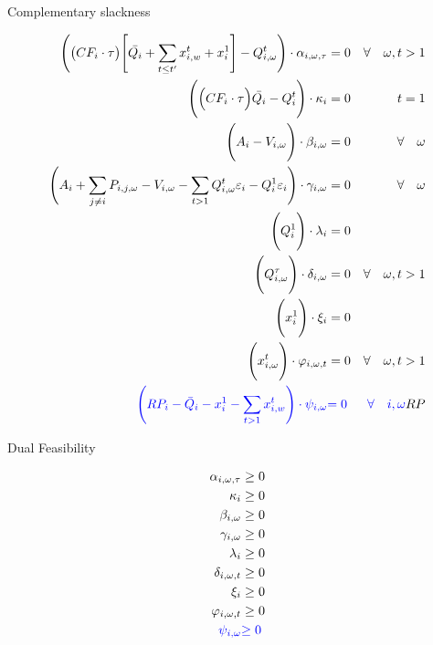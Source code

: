 \documentclass[11pt, letterpaper]{article}
\begin{document}
\smallskip

\begin{flushleft}
Complementary slackness
\end{flushleft}

\begin{align}
    \Bigg( \big(CF_i \cdot \tau \big) \Bigg[\bar{Q_i} + \sum_{t\leq t^{\prime}} x^{t}_{i,w} + x_i^{1} \Bigg] - Q_{i,\omega}^{t} \Bigg) \cdot \alpha_{i,\omega,\tau} & = 0 & \forall  \quad \omega, t  > 1\\
    \Bigg( \Big(CF_i\cdot\tau \Big)\bar{Q_i}-Q_{i}^{t} \Bigg)\cdot \kappa_i & = 0  & \quad t  =1 \\
    \Bigg(  A_{i} -V_{i,\omega} \Bigg) \cdot \beta_{i,\omega} & = 0 & \forall  \quad \omega\\
    \Bigg( A_{i} + \sum_{j \neq i}P_{i,j,\omega} - V_{i,\omega}-\sum_{t>1}Q_{i,\omega}^{t}\varepsilon_{i}-Q_i^{1}\varepsilon_{i}\Bigg)\cdot \gamma_{i,\omega} & = 0 & \forall \quad \omega \\
    \Bigg( Q_i^{1} \Bigg) \cdot \lambda_i & = 0 & \\
    \Bigg(Q_{i,\omega}^{\tau}\Bigg ) \cdot \delta_{i,\omega} & = 0 & \forall  \quad \omega, t >1\\
    \Bigg( x_i^{1} \Bigg) \cdot \xi_i & = 0 & \\
    \Bigg( x_{i, \omega}^{t} \Bigg) \cdot \varphi_{i,\omega,t} & = 0 & \forall  \quad \omega, t >1 \\
    {\color{blue} \Bigg(RP_i - \bar{Q}_i - x^{1}_i - \sum_{t>1} x^{t}_{i,w}  \Bigg) \cdot \psi_{i,\omega}}&  {\color{blue} = 0 }&  {\color{blue} \forall \quad i,\omega }
RP\end{align}

\smallskip

\begin{flushleft}
Dual Feasibility
\end{flushleft}

\begin{align}
    \alpha_{i,\omega,\tau} & \geq 0 \\
    \kappa_i & \geq 0 \\
    \beta_{i,\omega} & \geq 0 \\
    \gamma_{i,\omega} & \geq 0 \\
    \lambda_i & \geq 0 \\
    \delta_{i,\omega,t} & \geq 0 \\
    \xi_i & \geq 0 \\
    \varphi_{i,\omega,t} & \geq 0 \\
    {\color{blue}\psi_{i,\omega}} & {\color{blue} \geq 0}
\end{align}
\end{document}
